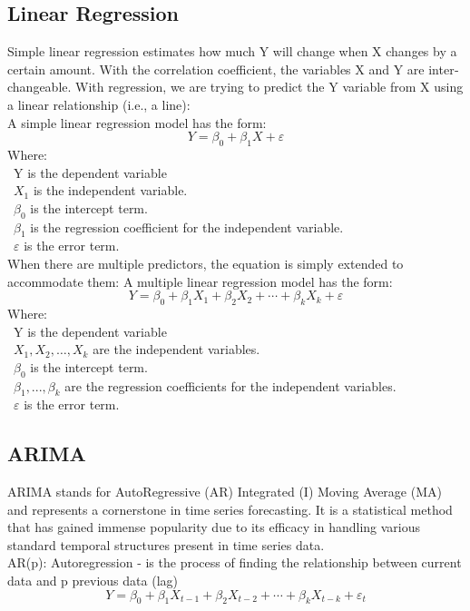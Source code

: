 \documentclass{ieeeojies}
\begin{document}
\subsection{Linear Regression}
Simple linear regression \cite{b12} estimates how much Y will change when X changes by a
certain amount. With the correlation coefficient, the variables X and Y are inter‐
changeable. With regression, we are trying to predict the Y variable from X using a
linear relationship (i.e., a line):\\
\indent A simple linear regression model has the form: 
\[Y=\beta_0+\beta_1X+\varepsilon\]
Where:\\
	\indent\textbullet\ Y is the dependent variable\\
	\indent\textbullet\ \(X_1\) is the independent variable.\\
	\indent\textbullet\ \(\beta_0\) is the intercept term.\\
	\indent\textbullet\ \(\beta_1\) is the regression coefficient for the independent variable.\\
	\indent\textbullet\ \(\varepsilon\) is the error term.\\

When there are multiple predictors, the equation is simply extended to accommodate
them:
A multiple linear regression model has the form: 
\[Y=\beta_0+\beta_1X_1+\beta_2X_2+\cdots+\beta_kX_k+\varepsilon\]
Where:\\
	\indent\textbullet\ Y is the dependent variable\\
	\indent\textbullet\ \(X_1, X_2, \ldots, X_k\) are the independent variables.\\
	\indent\textbullet\ \(\beta_0\) is the intercept term.\\
	\indent\textbullet\ \(\beta_1,..., \beta_k\) are the regression coefficients for the independent variables.\\
	\indent\textbullet\ \(\varepsilon\) is the error term.

\subsection{ARIMA}
\indent ARIMA \cite{b13} stands for AutoRegressive (AR) Integrated (I) Moving Average (MA) and represents a cornerstone in time series forecasting. It is a statistical method that has gained immense popularity due to its efficacy in handling various standard temporal structures present in time series data.\\
\indent AR(p): Autoregression - is the process of finding the relationship between
current data and p previous data (lag)
\[Y=\beta_0+\beta_1X_{t-1}+\beta_2X_{t-2}+\cdots+\beta_kX_{t-k}+\varepsilon_{t}\]
\end{document}

